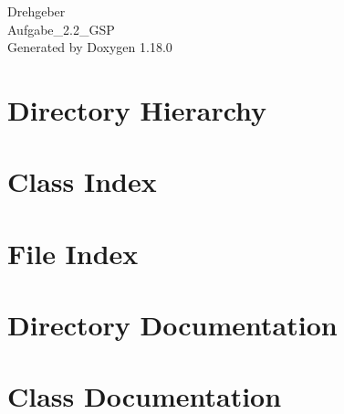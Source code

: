 \documentclass[twoside]{book}
\newcommand{\+}{\discretionary{\mbox{\scriptsize$\hookleftarrow$}}{}{}}
\newcommand{\clearemptydoublepage}{%
    \newpage{\pagestyle{empty}\cleardoublepage}%
  }
\begin{document}
  \raggedbottom
    \hypersetup{pageanchor=false,
                bookmarksnumbered=true,
                pdfencoding=unicode
               }
  \begin{titlepage}
  \vspace*{7cm}
  \begin{center}%
  {\Large Drehgeber}\\
  [1ex]\large Aufgabe\+\_\+2.\+2\+\_\+\+GSP \\
  \vspace*{1cm}
  {\large Generated by Doxygen 1.18.0}\\
  \end{center}
  \end{titlepage}
  \clearemptydoublepage
  \tableofcontents
  \clearemptydoublepage
  \hypersetup{pageanchor=true}
\chapter{Directory Hierarchy}

\chapter{Class Index}

\chapter{File Index}

\chapter{Directory Documentation}











\chapter{Class Documentation}


\end{document}

